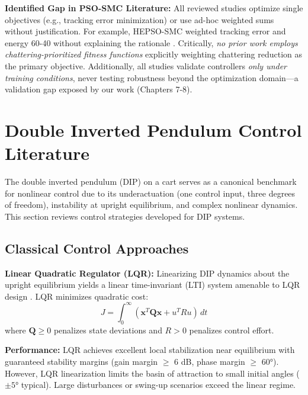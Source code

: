 \textbf{Identified Gap in PSO-SMC Literature:} All reviewed studies optimize single objectives (e.g., tracking error minimization) or use ad-hoc weighted sums without justification. For example, HEPSO-SMC weighted tracking error and energy 60-40 without explaining the rationale \cite{hepso2025manipulator}. Critically, \emph{no prior work employs chattering-prioritized fitness functions} explicitly weighting chattering reduction as the primary objective. Additionally, all studies validate controllers \emph{only under training conditions}, never testing robustness beyond the optimization domain—a validation gap exposed by our work (Chapters 7-8).

\section{Double Inverted Pendulum Control Literature}
\label{sec:dip_control}

The double inverted pendulum (DIP) on a cart serves as a canonical benchmark for nonlinear control due to its underactuation (one control input, three degrees of freedom), instability at upright equilibrium, and complex nonlinear dynamics. This section reviews control strategies developed for DIP systems.

\subsection{Classical Control Approaches}

\textbf{Linear Quadratic Regulator (LQR):} Linearizing DIP dynamics about the upright equilibrium yields a linear time-invariant (LTI) system amenable to LQR design \cite{anderson1971optimal}. LQR minimizes quadratic cost:
\begin{equation}
J = \int_0^\infty (\mathbf{x}^T \mathbf{Q} \mathbf{x} + u^T R u) \, dt
\label{eq:lqr_cost}
\end{equation}
where $\mathbf{Q} \geq 0$ penalizes state deviations and $R > 0$ penalizes control effort.

\textbf{Performance:} LQR achieves excellent local stabilization near equilibrium with guaranteed stability margins (gain margin $\geq$ 6 dB, phase margin $\geq$ 60°). However, LQR linearization limits the basin of attraction to small initial angles ($\pm 5°$ typical). Large disturbances or swing-up scenarios exceed the linear regime.

